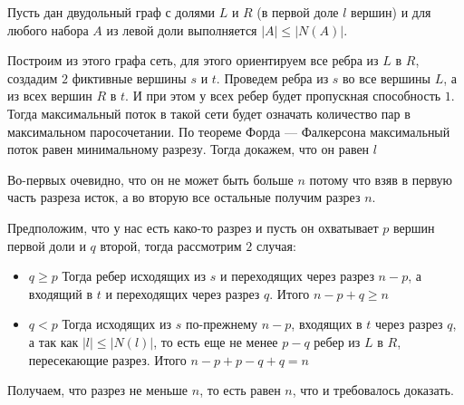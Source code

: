 \documentclass[12pt,letterpaper]{article}
\title{}
\newcommand{\br}[1]{\left(#1\right)}
\newcommand{\abs}[1]{\left|#1\right|}
\theoremstyle{definition}
\begin{document}
 
Пусть дан двудольный граф с долями $L$ и $R$ (в первой доле $l$ вершин) и для любого набора $A$ из левой доли выполняется $\abs{A} \leq \abs{N\br{A}}$.

Построим из этого графа сеть, для этого ориентируем все ребра из $L$ в $R$, создадим $2$ фиктивные вершины $s$ и $t$. Проведем ребра из $s$ во все вершины $L$, а из всех вершин $R$ в $t$. И при этом у всех ребер будет пропускная способность $1$. Тогда максимальный поток в такой сети будет означать количество пар в максимальном паросочетании. По теореме Форда — Фалкерсона максимальный поток равен минимальному разрезу. Тогда докажем, что он равен $l$

Во-первых очевидно, что он не может быть больше $n$ потому что взяв в первую часть разреза исток, а во вторую все остальные получим разрез $n$.

Предположим, что у нас есть како-то разрез и пусть он охватывает $p$ вершин первой доли и $q$ второй, тогда рассмотрим $2$ случая:
\begin{itemize}
	\item \underline{$q \geq p$} Тогда ребер исходящих из $s$ и переходящих через разрез $n - p$, а входящий в $t$ и переходящих через разрез $q$. Итого $n - p + q \geq n$
	\item \underline{$q < p$} Тогда исходящих из $s$ по-прежнему $n - p$, входящих в $t$ через разрез $q$, а так как $\abs{l} \leq \abs{N\br{l}}$, то есть еще не менее $p - q$ ребер из $L$ в $R$, пересекающие разрез. Итого $n - p + p - q + q = n$
\end{itemize}

Получаем, что разрез не меньше $n$, то есть равен $n$, что и требовалось доказать.
	
\end{document}
